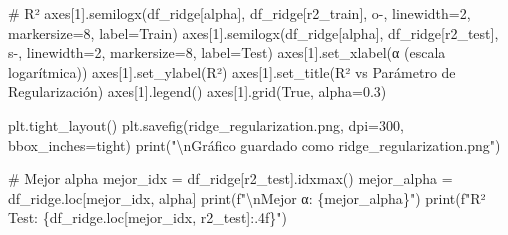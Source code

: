 \documentclass[
  doc,
  floatsintext,
  longtable,
  a4paper,
  nolmodern,
  notxfonts,
  notimes,
  12pt,
  colorlinks=true,linkcolor=blue,citecolor=blue,urlcolor=blue]{apa7}
\newenvironment{Shaded}{\begin{snugshade}}{\end{snugshade}}
\newcommand{\BuiltInTok}[1]{\textcolor[rgb]{0.00,0.23,0.31}{#1}}
\newcommand{\CharTok}[1]{\textcolor[rgb]{0.13,0.47,0.30}{#1}}
\newcommand{\CommentTok}[1]{\textcolor[rgb]{0.37,0.37,0.37}{#1}}
\newcommand{\DecValTok}[1]{\textcolor[rgb]{0.68,0.00,0.00}{#1}}
\newcommand{\FloatTok}[1]{\textcolor[rgb]{0.68,0.00,0.00}{#1}}
\newcommand{\NormalTok}[1]{\textcolor[rgb]{0.00,0.23,0.31}{#1}}
\newcommand{\OperatorTok}[1]{\textcolor[rgb]{0.37,0.37,0.37}{#1}}
\newcommand{\SpecialCharTok}[1]{\textcolor[rgb]{0.37,0.37,0.37}{#1}}
\newcommand{\SpecialStringTok}[1]{\textcolor[rgb]{0.13,0.47,0.30}{#1}}
\newcommand{\StringTok}[1]{\textcolor[rgb]{0.13,0.47,0.30}{#1}}
\newcommand{\VariableTok}[1]{\textcolor[rgb]{0.07,0.07,0.07}{#1}}
\begin{document}
\begin{Shaded}
\begin{Highlighting}[]
\CommentTok{\# R²}
\NormalTok{axes[}\DecValTok{1}\NormalTok{].semilogx(df\_ridge[}\StringTok{\textquotesingle{}alpha\textquotesingle{}}\NormalTok{], df\_ridge[}\StringTok{\textquotesingle{}r2\_train\textquotesingle{}}\NormalTok{], }
                \StringTok{\textquotesingle{}o{-}\textquotesingle{}}\NormalTok{, linewidth}\OperatorTok{=}\DecValTok{2}\NormalTok{, markersize}\OperatorTok{=}\DecValTok{8}\NormalTok{, label}\OperatorTok{=}\StringTok{\textquotesingle{}Train\textquotesingle{}}\NormalTok{)}
\NormalTok{axes[}\DecValTok{1}\NormalTok{].semilogx(df\_ridge[}\StringTok{\textquotesingle{}alpha\textquotesingle{}}\NormalTok{], df\_ridge[}\StringTok{\textquotesingle{}r2\_test\textquotesingle{}}\NormalTok{], }
                \StringTok{\textquotesingle{}s{-}\textquotesingle{}}\NormalTok{, linewidth}\OperatorTok{=}\DecValTok{2}\NormalTok{, markersize}\OperatorTok{=}\DecValTok{8}\NormalTok{, label}\OperatorTok{=}\StringTok{\textquotesingle{}Test\textquotesingle{}}\NormalTok{)}
\NormalTok{axes[}\DecValTok{1}\NormalTok{].set\_xlabel(}\StringTok{\textquotesingle{}α (escala logarítmica)\textquotesingle{}}\NormalTok{)}
\NormalTok{axes[}\DecValTok{1}\NormalTok{].set\_ylabel(}\StringTok{\textquotesingle{}R²\textquotesingle{}}\NormalTok{)}
\NormalTok{axes[}\DecValTok{1}\NormalTok{].set\_title(}\StringTok{\textquotesingle{}R² vs Parámetro de Regularización\textquotesingle{}}\NormalTok{)}
\NormalTok{axes[}\DecValTok{1}\NormalTok{].legend()}
\NormalTok{axes[}\DecValTok{1}\NormalTok{].grid(}\VariableTok{True}\NormalTok{, alpha}\OperatorTok{=}\FloatTok{0.3}\NormalTok{)}

\NormalTok{plt.tight\_layout()}
\NormalTok{plt.savefig(}\StringTok{\textquotesingle{}ridge\_regularization.png\textquotesingle{}}\NormalTok{, dpi}\OperatorTok{=}\DecValTok{300}\NormalTok{, bbox\_inches}\OperatorTok{=}\StringTok{\textquotesingle{}tight\textquotesingle{}}\NormalTok{)}
\BuiltInTok{print}\NormalTok{(}\StringTok{"}\CharTok{\textbackslash{}n}\StringTok{Gráfico guardado como \textquotesingle{}ridge\_regularization.png\textquotesingle{}"}\NormalTok{)}

\CommentTok{\# Mejor alpha}
\NormalTok{mejor\_idx }\OperatorTok{=}\NormalTok{ df\_ridge[}\StringTok{\textquotesingle{}r2\_test\textquotesingle{}}\NormalTok{].idxmax()}
\NormalTok{mejor\_alpha }\OperatorTok{=}\NormalTok{ df\_ridge.loc[mejor\_idx, }\StringTok{\textquotesingle{}alpha\textquotesingle{}}\NormalTok{]}
\BuiltInTok{print}\NormalTok{(}\SpecialStringTok{f"}\CharTok{\textbackslash{}n}\SpecialStringTok{Mejor α: }\SpecialCharTok{\{}\NormalTok{mejor\_alpha}\SpecialCharTok{\}}\SpecialStringTok{"}\NormalTok{)}
\BuiltInTok{print}\NormalTok{(}\SpecialStringTok{f"R² Test: }\SpecialCharTok{\{}\NormalTok{df\_ridge}\SpecialCharTok{.}\NormalTok{loc[mejor\_idx, }\StringTok{\textquotesingle{}r2\_test\textquotesingle{}}\NormalTok{]}\SpecialCharTok{:.4f\}}\SpecialStringTok{"}\NormalTok{)}
\end{Highlighting}
\end{Shaded}
\end{document}
